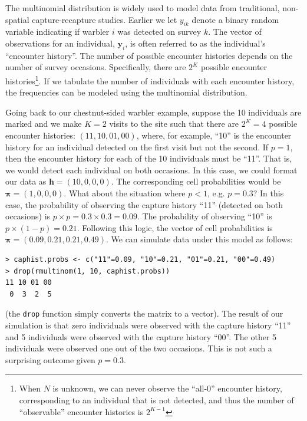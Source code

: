 The multinomial distribution is widely used to model data from traditional,
non-spatial capture-recapture studies.
Earlier we let $y_{ik}$ denote a binary random variable indicating if
warbler $i$ was detected on survey $k$. The vector of observations for an
individual, $\mathbf{y}_i$, is often referred to as the individual's
``encounter history''. The number of possible encounter
histories depends on the number of survey occasions. Specifically,
there are $2^K$
possible encounter histories\footnote{When $N$ is unknown, we can
  never observe the ``all-0'' encounter history, corresponding
to an individual that is not
  detected, and thus the number of ``observable'' encounter histories
  is $2^{K-1}$}.
If we tabulate the number of individuals with each encounter history,
the frequencies can be modeled using the multinomial
distribution. %

Going back to our
chestnut-sided warbler example, suppose the 10 individuals are marked
and we make $K=2$ visits to the site such that there are $2^K = 4$ possible encounter
histories: $(11, 10, 01, 00)$, where, for example,  ``10'' is the
encounter history for an individual detected on the first visit but not
the second. If $p=1$, then the
encounter history for each of the 10 individuals must  be ``11''. That
is, we would detect each individual on both occasions. In this case,
we could format our data as $\mathbf{h} = (10, 0, 0, 0)$. The
corresponding cell probabilities would be $\bm{\pi} = (1, 0, 0,
0)$. What about the situation where $p<1$, e.g. $p=0.3$? In this case, the
probability of observing the capture history ``11'' (detected on both
occasions) is $p \times p = 0.3 \times 0.3 = 0.09$. The probability of
observing ``10'' is $p \times (1-p) = 0.21$. Following this logic, the vector
of cell probabilities is $\bm{\pi} = (0.09, 0.21, 0.21, 0.49)$. We can
simulate data under this model as follows:
\begin{verbatim}
> caphist.probs <- c("11"=0.09, "10"=0.21, "01"=0.21, "00"=0.49)
> drop(rmultinom(1, 10, caphist.probs))
11 10 01 00
 0  3  2  5
\end{verbatim}
(the \verb+drop+ function simply converts the matrix to a vector).
The
result of our simulation is that zero individuals were observed with
the capture history ``11'' and 5 individuals were observed with the
capture history ``00''. The other 5 individuals were observed one out
of the two occasions. This is not such a surprising outcome given
$p=0.3$.

